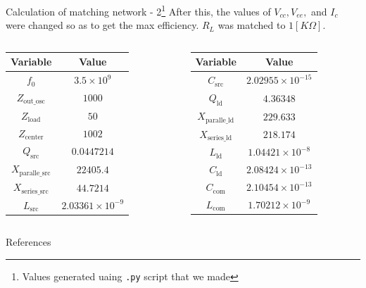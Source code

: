 \documentclass{beamer}
\begin{document}
\begin{frame}[fragile]{Calculation of matching network - 2\footnote{Values generated uaing \lstinline|.py| script that we made}}
After this, the values of \(V_{cc}, V_{ee}, \) and \(I_c\) were changed so as to get the max efficiency. \(R_L\) was matched to \(1[K\Omega]\).
\begin{columns}
  \begin{table}
    \centering
    \begin{tabular}{|c|c|}
        \hline
        \textbf{Variable} & \textbf{Value} \\
        \hline
        $f_0$ & $3.5 \times 10^9$ \\
        $Z_{\text{out\_osc}}$ & $1000$ \\
        $Z_{\text{load}}$ & $50$ \\
        $Z_{\text{center}}$ & $1002$ \\
        $Q_{\text{src}}$ & $0.0447214$ \\
        $X_{\text{paralle\_src}}$ & $22405.4$ \\
        $X_{\text{series\_src}}$ & $44.7214$ \\
        $L_{\text{src}}$ & $2.03361 \times 10^{-9}$ \\
        \hline
    \end{tabular}
  \end{table} 
  \begin{table}
    \centering
    \begin{tabular}{|c|c|}
        \hline
        \textbf{Variable} & \textbf{Value} \\
        \hline
        $C_{\text{src}}$ & $2.02955 \times 10^{-15}$ \\
        $Q_{\text{ld}}$ & $4.36348$ \\
        $X_{\text{paralle\_ld}}$ & $229.633$ \\
        $X_{\text{series\_ld}}$ & $218.174$ \\
        $L_{\text{ld}}$ & $1.04421 \times 10^{-8}$ \\
        $C_{\text{ld}}$ & $2.08424 \times 10^{-13}$ \\
        $C_{\text{com}}$ & $2.10454 \times 10^{-13}$ \\
        $L_{\text{com}}$ & $1.70212 \times 10^{-9}$ \\
        \hline
    \end{tabular}
  \end{table} 
\end{columns}

\end{frame}

\begin{frame}[allowframebreaks]{References}
  \nocite{*}
  
  
\end{frame} 
\end{document}

